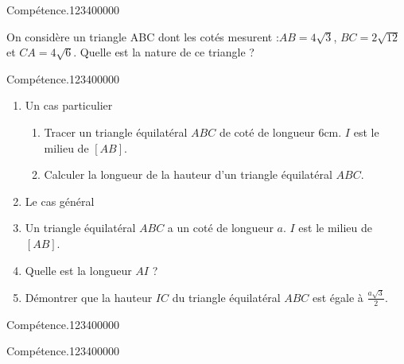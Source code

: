 
\begin{pageAD}  %
\restoregeometry %


\begin{ExoCad}{Compétence.}{1234}{0}{0}{0}{0}{0}
 
On considère un triangle ABC dont les cotés mesurent :$AB = 4\sqrt{3}$, $BC = 2\sqrt{12}$ et $CA= 4\sqrt{6}$. Quelle est la nature de ce triangle ?

\end{ExoCad}



\begin{ExoCad}{Compétence.}{1234}{0}{0}{0}{0}{0}
 

\begin{enumerate}
\item Un cas particulier
\begin{enumerate}
\item Tracer un triangle équilatéral $ABC$ de coté de longueur $6$cm. $I$ est le milieu de $[AB]$. 
\item Calculer la longueur de la hauteur d'un triangle équilatéral $ABC$.
\end{enumerate}
\item Le cas général
\item Un triangle équilatéral $ABC$ a un coté de longueur $a$. $I$ est le milieu de $[AB]$. 
\item Quelle est la longueur $AI$ ?
\item Démontrer que la hauteur $IC$ du triangle équilatéral $ABC$ est égale à $\frac{a\sqrt3}{2}$.
\end{enumerate}
 
\end{ExoCad}



\begin{ExoCad}{Compétence.}{1234}{0}{0}{0}{0}{0}

\end{ExoCad}


\begin{ExoCad}{Compétence.}{1234}{0}{0}{0}{0}{0}

\end{ExoCad}
 
\end{pageAD} %


